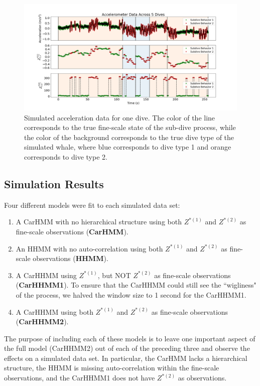 \begin{figure}[ht]
	\centering
	\includegraphics[width=5in]{../Plots/sim_data.png}
	\caption{Simulated acceleration data for one dive. The color of the line corresponds to the true fine-scale state of the sub-dive process, while the color of the background corresponds to the true dive type of the simulated whale, where blue corresponds to dive type 1 and orange corresponds to dive type 2.}
	\label{fig:sim_data}
\end{figure}


\subsection{Simulation Results}

Four different models were fit to each simulated data set:

\begin{enumerate}
    \item A CarHMM with no hierarchical structure using both $Z^{*(1)}$ and $Z^{*(2)}$ as fine-scale observations (\textbf{CarHMM}).
    \item An HHMM with no auto-correlation using both $Z^{*(1)}$ and $Z^{*(2)}$ as fine-scale observations (\textbf{HHMM}).
    \item A CarHHMM using $Z^{*(1)}$, but NOT $Z^{*(2)}$ as fine-scale observations (\textbf{CarHHMM1}). To ensure that the CarHHMM could still see the ``wigliness" of the process, we halved the window size to 1 second for the CarHHMM1.
    \item A CarHHMM using both $Z^{*(1)}$ and $Z^{*(2)}$ as fine-scale observations (\textbf{CarHHMM2}).
\end{enumerate}
%
The purpose of including each of these models is to leave one important aspect of the full model (CarHHMM2) out of each of the preceding three and observe the effects on a simulated data set. In particular, the CarHMM lacks a hierarchical structure, the HHMM is missing auto-correlation within the fine-scale observations, and the CarHHMM1 does not have $Z^{*(2)}$ as observations.


